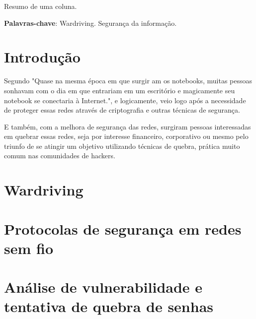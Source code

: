 \documentclass[
	article,			%
	12pt,				%
	oneside,			%
	a4paper,			%
	english,			%
	brazil,				%
	sumario=tradicional
	]{abntex2}
\begin{document}

\frenchspacing

\maketitle

\begin{resumoumacoluna}
 Resumo de uma coluna.

 \vspace{\onelineskip}

 \noindent
 \textbf{Palavras-chave}: Wardriving. Segurança da informação.
\end{resumoumacoluna}

\textual

\section*{Introdução}

Segundo \cite[p. 67]{redes-tanenbaum} "Quase na mesma época em que surgir am os notebooks, muitas pessoas sonhavam com o dia em que entrariam em um escritório e magicamente seu notebook se conectaria à Internet.", e logicamente, veio logo após a necessidade de proteger essas redes através de criptografia e outras técnicas de segurança.

E também, com a melhora de segurança das redes, surgiram pessoas interessadas em quebrar essas redes, seja por interesse financeiro, corporativo ou mesmo pelo triunfo de se atingir um objetivo utilizando técnicas de quebra, prática muito comum nas comunidades de hackers.

\section{Wardriving}


\section{Protocolas de segurança em redes sem fio}

\section{Análise de vulnerabilidade e tentativa de quebra de senhas}
\end{document}
